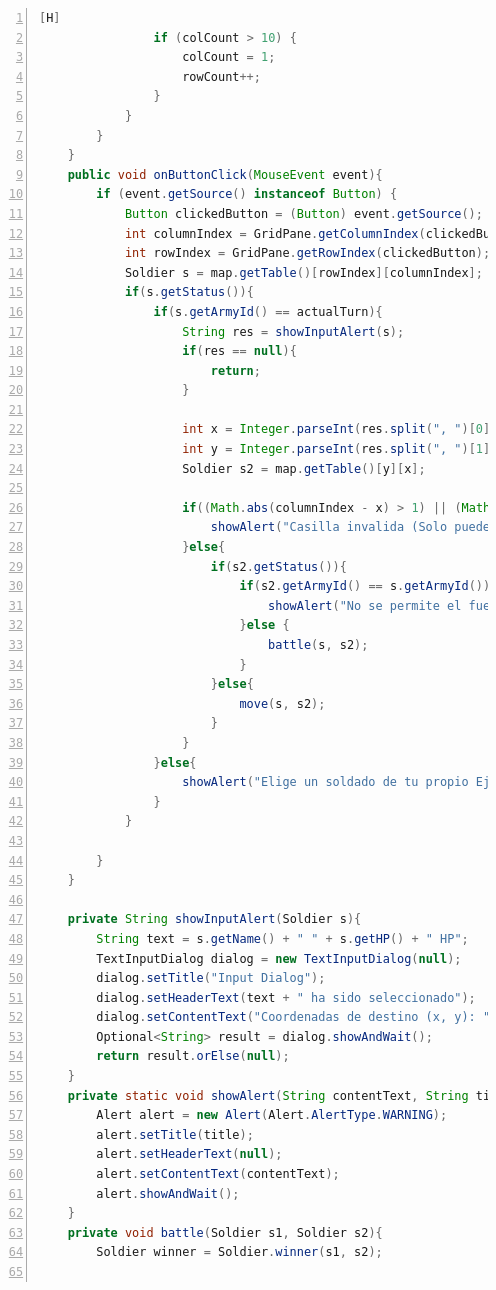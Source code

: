 \documentclass{article}
\begin{document}
\begin{lstlisting}[language=java,caption={Clase controladora}, numbers=left][H]
                if (colCount > 10) {
                    colCount = 1;
                    rowCount++;
                }
            }
        }
    }
    public void onButtonClick(MouseEvent event){
        if (event.getSource() instanceof Button) {
            Button clickedButton = (Button) event.getSource();
            int columnIndex = GridPane.getColumnIndex(clickedButton);
            int rowIndex = GridPane.getRowIndex(clickedButton);
            Soldier s = map.getTable()[rowIndex][columnIndex];
            if(s.getStatus()){
                if(s.getArmyId() == actualTurn){
                    String res = showInputAlert(s);
                    if(res == null){
                        return;
                    }

                    int x = Integer.parseInt(res.split(", ")[0]);
                    int y = Integer.parseInt(res.split(", ")[1]);
                    Soldier s2 = map.getTable()[y][x];

                    if((Math.abs(columnIndex - x) > 1) || (Math.abs(rowIndex - y) > 1)){
                        showAlert("Casilla invalida (Solo puedes moverte una casilla en cada direccion)", "Error");
                    }else{
                        if(s2.getStatus()){
                            if(s2.getArmyId() == s.getArmyId()){
                                showAlert("No se permite el fuego aliado", "Error");
                            }else {
                                battle(s, s2);
                            }
                        }else{
                            move(s, s2);
                        }
                    }
                }else{
                    showAlert("Elige un soldado de tu propio Ejercito", "Error");
                }
            }

        }
    }

    private String showInputAlert(Soldier s){
        String text = s.getName() + " " + s.getHP() + " HP";
        TextInputDialog dialog = new TextInputDialog(null);
        dialog.setTitle("Input Dialog");
        dialog.setHeaderText(text + " ha sido seleccionado");
        dialog.setContentText("Coordenadas de destino (x, y): ");
        Optional<String> result = dialog.showAndWait();
        return result.orElse(null);
    }
    private static void showAlert(String contentText, String title) {
        Alert alert = new Alert(Alert.AlertType.WARNING);
        alert.setTitle(title);
        alert.setHeaderText(null);
        alert.setContentText(contentText);
        alert.showAndWait();
    }
    private void battle(Soldier s1, Soldier s2){
        Soldier winner = Soldier.winner(s1, s2);


\end{lstlisting}
\end{document}
